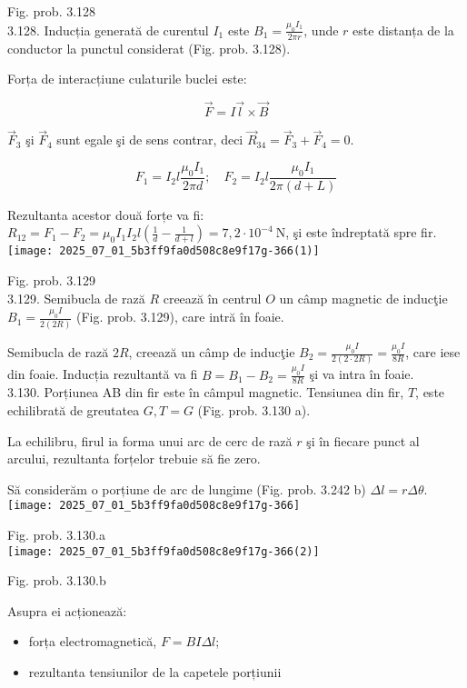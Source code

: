 Fig. prob. 3.128\\
3.128. Inducția generată de curentul $I_{1}$ este $B_{1}=\frac{\mu_{0} I_{1}}{2 \pi r}$, unde $r$ este distanța de la conductor la punctul considerat (Fig. prob. 3.128).

Forța de interacțiune culaturile buclei este:

$$
\vec{F}=I \vec{l} \times \vec{B}
$$

$\vec{F}_{3}$ şi $\vec{F}_{4}$ sunt egale şi de sens contrar, deci $\vec{R}_{34}=\vec{F}_{3}+\vec{F}_{4}=0$.

$$
F_{1}=I_{2} l \frac{\mu_{0} I_{1}}{2 \pi d} ; \quad F_{2}=I_{2} l \frac{\mu_{0} I_{1}}{2 \pi(d+L)}
$$

Rezultanta acestor două forțe va fi:\\
$R_{12}=F_{1}-F_{2}=\mu_{0} I_{1} I_{2} l\left(\frac{1}{d}-\frac{1}{d+l}\right)=7,2 \cdot 10^{-4} \mathrm{~N}$, şi este îndreptată spre fir.\\
\texttt{[image: 2025\_07\_01\_5b3ff9fa0d508c8e9f17g-366(1)]}

Fig. prob. 3.129\\
3.129. Semibucla de rază $R$ creează în centrul $O$ un câmp magnetic de inducţie $B_{1}=\frac{\mu_{0} I}{2(2 R)}$ (Fig. prob. 3.129), care intră în foaie.

Semibucla de rază $2 R$, creează un câmp de inducţie $B_{2}=\frac{\mu_{0} I}{2(2 \cdot 2 R)}=\frac{\mu_{0} I}{8 R}$, care iese din foaie. Inducția rezultantă va fi $B=B_{1}-B_{2}=\frac{\mu_{0} I}{8 R}$ şi va intra în foaie.\\
3.130. Porțiunea AB din fir este în câmpul magnetic. Tensiunea din fir, $T$, este echilibrată de greutatea $G, T=G$ (Fig. prob. 3.130 a).

La echilibru, firul ia forma unui arc de cerc de rază $r$ şi în fiecare punct al arcului, rezultanta forțelor trebuie să fie zero.

Să considerăm o porțiune de arc de lungime (Fig. prob. 3.242 b) $\Delta l=r \Delta \theta$.\\
\texttt{[image: 2025\_07\_01\_5b3ff9fa0d508c8e9f17g-366]}

Fig. prob. 3.130.a\\
\texttt{[image: 2025\_07\_01\_5b3ff9fa0d508c8e9f17g-366(2)]}

Fig. prob. 3.130.b

Asupra ei acționează:

\begin{itemize}
  \item forța electromagnetică, $F=B I \Delta l$;
  \item rezultanta tensiunilor de la capetele porțiunii
\end{itemize}

